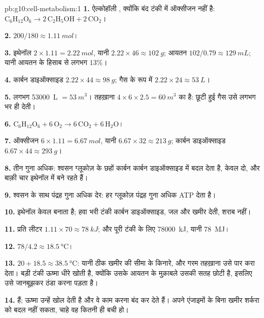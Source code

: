 \begin{solution}{pb:g10:cell-metabolism:1}
\textbf{1.} ऐल्कोहॉली , क्योंकि बंद टंकी में ऑक्सीजन नहीं है:
$\mathrm{C_6H_{12}O_6} \to 2\,\mathrm{C_2H_5OH} +
2\,\mathrm{CO_2}$।

\textbf{2.} $200/180 \approx \qty{1.11}{mol}$।

\textbf{3.} इथेनॉल $2 \times 1.11 = \qty{2.22}{mol}$, यानी $2.22
\times 46 \approx \qty{102}{g}$; आयतन $102/0.79 \approx
\qty{129}{mL}$; यानी आयतन के हिसाब से लगभग 13\%।

\textbf{4.} कार्बन डाइऑक्साइड $2.22 \times 44 \approx \qty{98}{g}$;
गैस के रूप में $2.22 \times 24 \approx \qty{53}{L}$।

\textbf{5.} लगभग \qty{53000}{L} $= \qty{53}{m^3}$। तहख़ाना
$4 \times 6 \times 2.5 = \qty{60}{m^3}$ का है: छूटी हुई गैस उसे लगभग भर
ही देती।

\textbf{6.} $\mathrm{C_6H_{12}O_6} + 6\,\mathrm{O_2} \to
6\,\mathrm{CO_2} + 6\,\mathrm{H_2O}$।

\textbf{7.} ऑक्सीजन $6 \times 1.11 = \qty{6.67}{mol}$, यानी $6.67 \times 32
\approx \qty{213}{g}$; कार्बन डाइऑक्साइड $6.67 \times 44 \approx
\qty{293}{g}$।

\textbf{8.} तीन गुना अधिक: श्वसन ग्लूकोज़ के छहों कार्बन कार्बन
डाइऑक्साइड में बदल देता है,  केवल दो, और बाक़ी चार इथेनॉल में बने
रहते हैं।

\textbf{9.} श्वसन के साथ पंद्रह गुना अधिक देर: हर ग्लूकोज़ पंद्रह गुना
अधिक ATP देता है।

\textbf{10.} इथेनॉल केवल  बनाता है; हवा भरी टंकी कार्बन
डाइऑक्साइड, जल और खमीर देती, शराब नहीं।

\textbf{11.} प्रति लीटर $1.11 \times 70 \approx \qty{78}{kJ}$; और पूरी
टंकी के लिए \qty{78000}{kJ}, यानी \qty{78}{MJ}।

\textbf{12.} $78/4.2 \approx \qty{18.5}{\celsius}$।

\textbf{13.} $20 + 18.5 \approx \qty{38.5}{\celsius}$: यानी ठीक खमीर की
सीमा के किनारे, और गरम तहख़ाना उसे पार करा देता। बड़ी टंकी ऊष्मा धीरे
खोती है, क्योंकि उसके आयतन के मुक़ाबले उसकी सतह छोटी है, इसलिए उसे
जानबूझकर ठंडा करना पड़ता है।

\textbf{14.}   हैं; ऊष्मा उन्हें खोल देती है और वे काम करना
बंद कर देते हैं। अपने एंजाइमों के बिना खमीर शर्करा को बदल नहीं सकता,
चाहे वह कितनी ही बची हो।


\end{solution}
